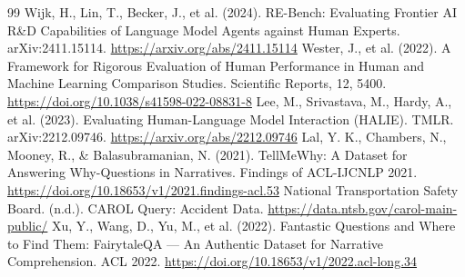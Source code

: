 \begin{thebibliography}{99}
 Wijk, H., Lin, T., Becker, J., et al. (2024). RE-Bench: Evaluating Frontier AI R\&D Capabilities of Language Model Agents against Human Experts. arXiv:2411.15114. \url{https://arxiv.org/abs/2411.15114}
 Wester, J., et al. (2022). A Framework for Rigorous Evaluation of Human Performance in Human and Machine Learning Comparison Studies. Scientific Reports, 12, 5400. \url{https://doi.org/10.1038/s41598-022-08831-8}
 Lee, M., Srivastava, M., Hardy, A., et al. (2023). Evaluating Human-Language Model Interaction (HALIE). TMLR. arXiv:2212.09746. \url{https://arxiv.org/abs/2212.09746}
 Lal, Y. K., Chambers, N., Mooney, R., \& Balasubramanian, N. (2021). TellMeWhy: A Dataset for Answering Why-Questions in Narratives. Findings of ACL-IJCNLP 2021. \url{https://doi.org/10.18653/v1/2021.findings-acl.53}
 National Transportation Safety Board. (n.d.). CAROL Query: Accident Data. \url{https://data.ntsb.gov/carol-main-public/}
 Xu, Y., Wang, D., Yu, M., et al. (2022). Fantastic Questions and Where to Find Them: FairytaleQA --- An Authentic Dataset for Narrative Comprehension. ACL 2022. \url{https://doi.org/10.18653/v1/2022.acl-long.34}
\end{thebibliography}

